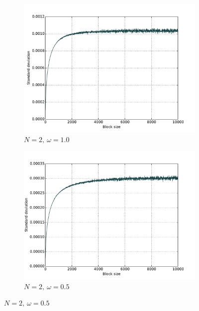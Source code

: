 \documentclass[english, a4paper]{article}
\begin{document}
		\begin{figure}[H]
			
			\begin{subfigure}{0.5\textwidth}
				\includegraphics[width=\linewidth]{figures/blocking/filipN2w100.pdf}
				\caption{$N=2,\:\omega=1.0$}
				\label{fig:blockingN2w100}
			\end{subfigure}
			\begin{subfigure}{0.5\textwidth}
				\includegraphics[width=\linewidth]{figures/blocking/filipN2w50.pdf}
				\caption{$N=2,\:\omega=0.5$}
				\label{fig:blockingN2w50}
			\end{subfigure}
			
			\vspace{1mm}
			

\end{figure}
\end{document}
